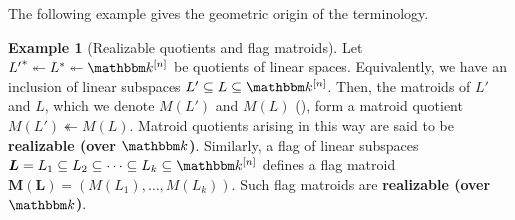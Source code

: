 \documentclass[11pt]{amsart}
\newcommand{\MM}{{\boldsymbol M}}
\newcommand{\kk}{\mathbbm k}
\theoremstyle{definition}
\newtheorem{eg}[thm]{Example}
\newcommand{\madeline}[1]{{\color{magenta} \sf  Madeline: [#1]}}
\begin{document}
The following example gives the geometric origin of the terminology.

\begin{eg}[Realizable quotients and flag matroids]
\label{eg:kquot}
Let ${L'}^* \twoheadleftarrow L^* \twoheadleftarrow \kk^{[n]}$ be quotients of linear spaces.  Equivalently, we have an inclusion of linear subspaces $L' \subseteq L \subseteq \kk^{[n]}$.  Then, the matroids of $L'$ and $L$, which we denote $M(L')$ and $M(L)$ (), form a matroid quotient $M(L') \twoheadleftarrow M(L)$.  Matroid quotients arising in this way are said to be \textbf{realizable (over $\kk$)}.  Similarly, a flag of linear subspaces $\boldsymbol L = L_1 \subseteq L_2 \subseteq \cdots \subseteq L_k \subseteq \kk^{[n]}$ defines a flag matroid $\MM(\boldsymbol L) = (M(L_1), \ldots, M(L_k))$.  Such flag matroids are \textbf{realizable (over $\kk$)}.
\end{eg}

\end{document}
